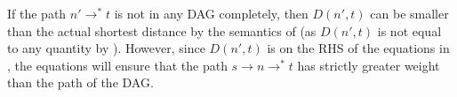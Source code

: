 If the path $n' \rightarrow^* t$ 
is not in any DAG completely, then
$D(n',t)$ can be smaller than the actual shortest distance by the
semantics of  (as
$D(n',t)$ is not equal to any quantity by ).
However, since $D(n',t)$ is on the RHS of the equations in ,
the equations will ensure that the path $s\rightarrow n \rightarrow^* t$
has strictly greater weight than the path of the DAG.

